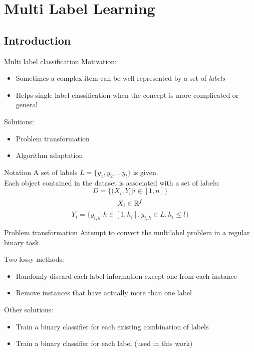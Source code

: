  \section{Multi Label Learning}
 
\subsection{Introduction}
\begin{frame}{Multi label classification}
	Motivation:
	\begin{itemize}\setlength\itemsep{1em}
		\item Sometimes a complex item can be well represented by a set of \textit{labels}
		\item Helps single label classification when the concept is more complicated or general
	\end{itemize}
	Solutions:
	\begin{itemize}\setlength\itemsep{1em}
		\item Problem transformation
		\item Algorithm adaptation
	\end{itemize}
\end{frame}

\begin{frame}{Notation}
	A set of labels $L = \{y_1, y_2,... y_l\}$ is given.\\
	Each object contained in the dataset is associated with a set of labels:
	$$D = \{(X_i, Y_i | i \in [1, n]\}$$
	$$X_i \in \mathbb{R}^f$$
	$$Y_i = \{y_{i,h} | h \in [1, h_i], y_{i,h} \in L, h_i \leq l\}$$
\end{frame}

\begin{frame}{Problem transformation}
	Attempt to convert the multilabel problem in a regular binary task.
	
	Two lossy methods:
	\begin{itemize}\setlength\itemsep{1em}
		\item Randomly discard each label information except one from each instance
		\item Remove instances that have actually more than one label
	\end{itemize}
	Other solutions:
	\begin{itemize}\setlength\itemsep{1em}
		\item Train a binary classifier for each existing combination of labels
		\item Train a binary classifier for each label (used in this work)
	\end{itemize}
\end{frame}

